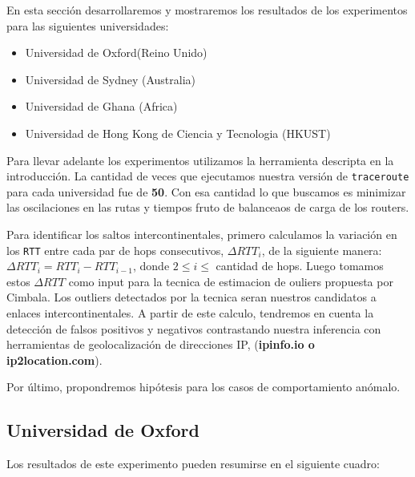 En esta sección desarrollaremos y mostraremos los resultados de los experimentos para las siguientes
universidades:

\begin{itemize}
\item Universidad de Oxford(Reino Unido)
\item Universidad de Sydney (Australia)
\item Universidad de Ghana (Africa)
\item Universidad de Hong Kong de Ciencia y Tecnologia (HKUST)
\end{itemize}

Para llevar adelante los experimentos utilizamos la herramienta descripta en la introducción. La cantidad de veces que ejecutamos nuestra versión de \texttt{traceroute} para cada universidad fue de \textbf{50}. Con esa cantidad lo que buscamos  es minimizar las oscilaciones en las rutas y tiempos fruto de balanceaos de carga de los routers.

Para identificar los saltos intercontinentales, primero calculamos la variación en los \texttt{RTT} entre cada par de hops consecutivos, $\Delta RTT_{i}$, de la siguiente manera: \(\Delta RTT_{i} = RTT_{i} - RTT_{i-1}\), donde $2 \leq i \leq$ cantidad de hops. Luego tomamos estos $\Delta RTT$ como input para la tecnica de estimacion de ouliers propuesta por Cimbala. Los outliers detectados por la tecnica seran nuestros candidatos a enlaces intercontinentales.
A partir de este calculo, tendremos en cuenta la detección de falsos positivos y negativos contrastando nuestra inferencia con herramientas de geolocalización de direcciones IP, (\textbf{ipinfo.io o ip2location.com}).

Por último, propondremos hipótesis para los casos de comportamiento anómalo.

\subsection{Universidad de Oxford}

Los resultados de este experimento pueden resumirse en el siguiente cuadro:

